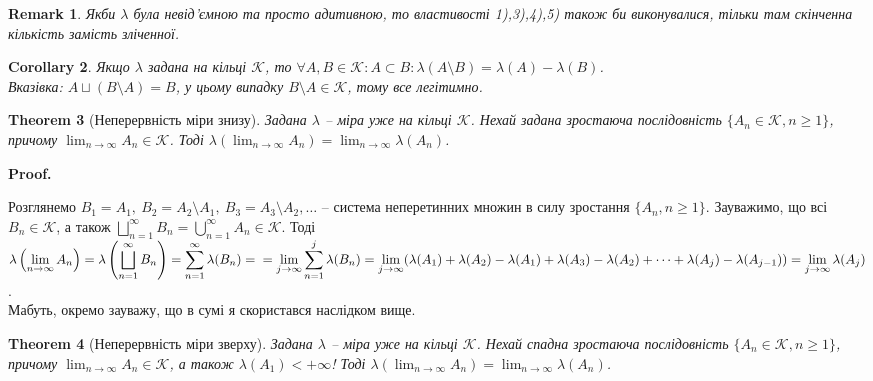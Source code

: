 \documentclass[a4paper, 10pt]{article}
\makeatletter
\theoremstyle{theoremdd}
\newtheorem{theorem}{Theorem}[subsection]
\newtheorem{remark}[theorem]{Remark}
\newtheorem{corollary}[theorem]{Corollary}
\renewenvironment{proof}[1][Proof.\\]{\par
\pushQED{\hfill \qed}%
\normalfont \topsep6\p@\@plus6\p@\relax
\trivlist
\item\relax
{\bfseries
#1\@addpunct{.}}\hspace\labelsep\ignorespaces
}{%
\popQED\endtrivlist\@endpefalse
}
\makeatother
\begin{document}
\begin{remark}
Якби $\lambda$ була невід'ємною та просто адитивною, то властивості 1),3),4),5) також би виконувалися, тільки там скінченна кількість замість зліченної.
\end{remark}

\begin{corollary}
Якщо $\lambda$ задана на кільці $\mathcal{K}$, то $\forall A,B \in \mathcal{K}: A \subset B: \lambda(A \setminus B) = \lambda(A) - \lambda(B)$.\\
\textit{Вказівка: $A \sqcup (B \setminus A) = B$, у цьому випадку $B \setminus A \in \mathcal{K}$, тому все легітимно.}
\end{corollary}

\begin{theorem}[Неперервність міри знизу]
Задана $\lambda$ -- міра уже на кільці $\mathcal{K}$. Нехай задана зростаюча послідовність $\{A_n \in \mathcal{K}, n \geq 1\}$, причому $\displaystyle\lim_{n \to \infty} A_n \in \mathcal{K}$. Тоді $\displaystyle\lambda\left(\lim_{n \to \infty} A_n\right) = \lim_{n \to \infty} \lambda(A_n)$.
\end{theorem}

\begin{proof}
Розглянемо $B_1 = A_1,\ B_2 = A_2 \setminus A_1,\ B_3 = A_3 \setminus A_2, \dots$ -- система неперетинних множин в силу зростання $\{A_n, n \geq 1\}$. Зауважимо, що всі $B_n \in \mathcal{K}$, а також $\displaystyle\bigsqcup_{n=1}^\infty B_n = \bigcup_{n=1}^\infty A_n \in \mathcal{K}$. Тоді\\
$\displaystyle\lambda\left(\lim_{n \to \infty} A_n\right) = \lambda\left( \bigsqcup_{n=1}^\infty B_n \right) = \sum_{n=1}^\infty \lambda(B_n) = \\ =\lim_{j \to \infty} \sum_{n=1}^j \lambda(B_n) = \lim_{j \to \infty} (\lambda(A_1) + \lambda(A_2) - \lambda(A_1) + \lambda(A_3) - \lambda(A_2) + \dots + \lambda(A_j) - \lambda(A_{j-1})) = \lim_{j \to \infty} \lambda(A_j)$.\\
Мабуть, окремо зауважу, що в сумі я скористався наслідком вище.
\end{proof}

\begin{theorem}[Неперервність міри зверху]
Задана $\lambda$ -- міра уже на кільці $\mathcal{K}$. Нехай спадна зростаюча послідовність $\{A_n \in \mathcal{K}, n \geq 1\}$, причому $\displaystyle\lim_{n \to \infty} A_n \in \mathcal{K}$, а також $\lambda(A_1) < +\infty$! Тоді $\displaystyle\lambda\left(\lim_{n \to \infty} A_n\right) = \lim_{n \to \infty} \lambda(A_n)$.
\end{theorem}
\end{document}
